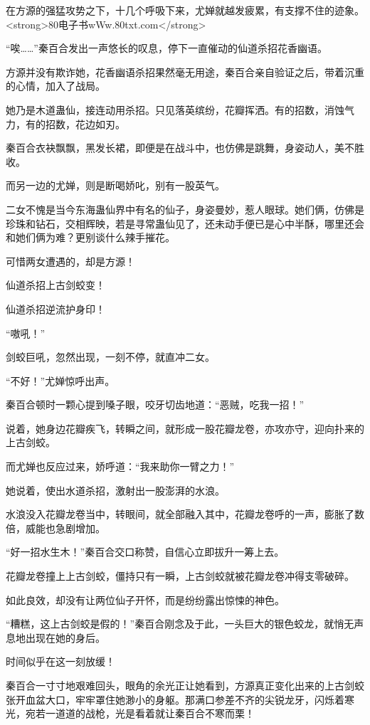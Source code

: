 
\begin{this_body}

在方源的强猛攻势之下，十几个呼吸下来，尤婵就越发疲累，有支撑不住的迹象。<strong>80电子书wWw.80txt.com</strong>

“唉……”秦百合发出一声悠长的叹息，停下一直催动的仙道杀招花香幽语。

方源并没有欺诈她，花香幽语杀招果然毫无用途，秦百合亲自验证之后，带着沉重的心情，加入了战局。

她乃是木道蛊仙，接连动用杀招。只见落英缤纷，花瓣挥洒。有的招数，消蚀气力，有的招数，花边如刃。

秦百合衣袂飘飘，黑发长裙，即便是在战斗中，也仿佛是跳舞，身姿动人，美不胜收。

而另一边的尤婵，则是断喝娇叱，别有一股英气。

二女不愧是当今东海蛊仙界中有名的仙子，身姿曼妙，惹人眼球。她们俩，仿佛是珍珠和钻石，交相辉映，若是寻常蛊仙见了，还未动手便已是心中半酥，哪里还会和她们俩为难？更别谈什么辣手摧花。

可惜两女遭遇的，却是方源！

仙道杀招上古剑蛟变！

仙道杀招逆流护身印！

“嗷吼！”

剑蛟巨吼，忽然出现，一刻不停，就直冲二女。

“不好！”尤婵惊呼出声。

秦百合顿时一颗心提到嗓子眼，咬牙切齿地道：“恶贼，吃我一招！”

说着，她身边花瓣疾飞，转瞬之间，就形成一股花瓣龙卷，亦攻亦守，迎向扑来的上古剑蛟。

而尤婵也反应过来，娇呼道：“我来助你一臂之力！”

她说着，使出水道杀招，激射出一股澎湃的水浪。

水浪没入花瓣龙卷当中，转眼间，就全部融入其中，花瓣龙卷呼的一声，膨胀了数倍，威能也急剧增加。

“好一招水生木！”秦百合交口称赞，自信心立即拔升一筹上去。

花瓣龙卷撞上上古剑蛟，僵持只有一瞬，上古剑蛟就被花瓣龙卷冲得支零破碎。

如此良效，却没有让两位仙子开怀，而是纷纷露出惊悚的神色。

“糟糕，这上古剑蛟是假的！”秦百合刚念及于此，一头巨大的银色蛟龙，就悄无声息地出现在她的身后。

时间似乎在这一刻放缓！

秦百合一寸寸地艰难回头，眼角的余光正让她看到，方源真正变化出来的上古剑蛟张开血盆大口，牢牢罩住她渺小的身躯。那满口参差不齐的尖锐龙牙，闪烁着寒光，宛若一道道的战枪，光是看着就让秦百合不寒而栗！


\end{this_body}
